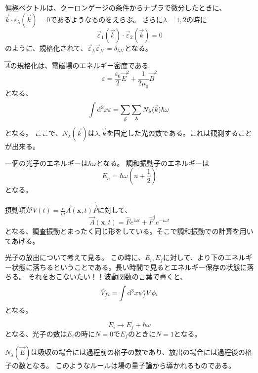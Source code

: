 \documentclass[titlepage]{ltjsarticle}
\begin{document}
偏極ベクトルは、クーロンゲージの条件からナブラで微分したときに、\(\vec{k}\cdot\varepsilon_{\lambda}(\vec{k})=0\)であるようなものをえらぶ。
さらに\(\lambda=1,2\)の時に
\begin{equation}
  \vec{\varepsilon}_1(\vec{k}) \cdot \vec{\varepsilon}_2(\vec{k}) = 0
\end{equation}
のように、規格化されて、\(\vec{\varepsilon}_{\lambda}\vec{\varepsilon}_{\lambda'}=\delta_{\lambda\lambda'}\)となる。

\(\vec{A}\)の規格化は、電磁場のエネルギー密度である
\begin{equation}
  \varepsilon = \frac{\varepsilon_0}{2}\vec{E}^2 + \frac{1}{2 \mu_0} \vec{B}^2
\end{equation}
となる、
\begin{equation}
  \int \odif[order=3]{x} \varepsilon = \sum_{\vec{k}} \sum_{\lambda} N_{\lambda}(\vec{k}) \hbar \omega
\end{equation}
となる。
ここで、\(N_{\lambda}(\vec{k})\)は\(\lambda,\vec{k}\)を固定した光の数である。これは観測することが出来る。

一個の光子のエネルギーは\(\hbar \omega\)となる。
調和振動子のエネルギーは
\begin{equation}
  E_{n} = \hbar \omega \left(  n + \frac{1}{2} \right)
\end{equation}
となる。

摂動項が\(V(t) = \frac{e}{m} \vec{A}(\bm{x},t) \hat{\vec{P}}\)に対して、
\begin{equation}
  \vec{A}(\bm{x},t) = \hat{F}e^{i \omega t} + \hat{F}^\dagger e^{-i \omega t}
\end{equation}
となる、調査振動とまったく同じ形をしている。そこで調和振動での計算を用いてあげる。

光子の放出について考えて見る。
この時に、\(E_i,E_f\)に対して、より下のエネルギー状態に落ちるということである。長い時間で見るとエネルギー保存の状態に落ちる。
それをおこないたい！！波動関数の言葉で書くと、
\begin{equation}
  \hat{V}_{fi} = \int \odif[order=3]{x} \psi^*_f V \phi_i 
\end{equation}
となる。

\begin{equation}
  E_i \to E_f + \hbar \omega
\end{equation}
となる、光子の数は\(E_i\)の時に\(N=0\)で\(E_f\)のときに\(N=1\)となる。

\(N_{\lambda}(\vec{E})\)は吸収の場合には過程前の格子の数であり、放出の場合には過程後の格子の数となる。
このようなルールは場の量子論から導かれるものである。
\end{document}
